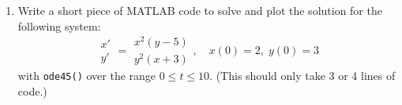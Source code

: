 \documentclass[letterpaper, fontsize=12pt]{scrartcl} %
\numberwithin{equation}{section} %
\numberwithin{figure}{section} %
\numberwithin{table}{section} %
\begin{document}
\begin{enumerate}
\begin{enumerate}[label = (\alph*)]
\item Write a short piece of MATLAB code to solve and plot the solution for the following system:
\[ \begin{matrix} x' \\ y' \end{matrix} = \begin{matrix} x^2(y - 5) \\ y^2(x +3) \end{matrix}, \quad x(0) = 2, \;y(0) = 3 \]
with \texttt{ode45()} over the range $0 \leq t \leq 10$. (This should only take 3 or 4 lines of code.) 

%
%
%
%
%

\end{enumerate}


\end{enumerate}

\end{document}
